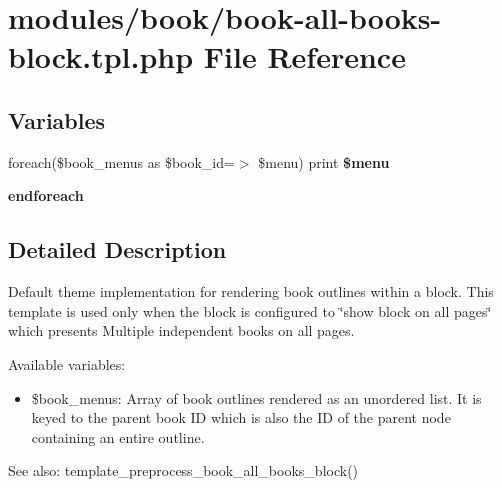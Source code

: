\hypertarget{book-all-books-block_8tpl_8php}{
\section{modules/book/book-all-books-block.tpl.php File Reference}
\label{book-all-books-block_8tpl_8php}
}
\subsection*{Variables}
\begin{CompactItemize}
\item 
\hypertarget{book-all-books-block_8tpl_8php_c0cb1c6382b1c2617e55b97ab05c7e6a}{
foreach(\$book\_\-menus as \$book\_\-id=$>$ \$menu) print \textbf{\$menu}}
\label{book-all-books-block_8tpl_8php_c0cb1c6382b1c2617e55b97ab05c7e6a}

\item 
\hypertarget{book-all-books-block_8tpl_8php_672d9707ef91db026c210f98cc601123}{
\textbf{endforeach}}
\label{book-all-books-block_8tpl_8php_672d9707ef91db026c210f98cc601123}

\end{CompactItemize}


\subsection{Detailed Description}
Default theme implementation for rendering book outlines within a block. This template is used only when the block is configured to \char`\"{}show block on all pages\char`\"{} which presents Multiple independent books on all pages.

Available variables:\begin{itemize}
\item \$book\_\-menus: Array of book outlines rendered as an unordered list. It is keyed to the parent book ID which is also the ID of the parent node containing an entire outline.\end{itemize}


\begin{Desc}
\item[See also:]template\_\-preprocess\_\-book\_\-all\_\-books\_\-block() \end{Desc}
